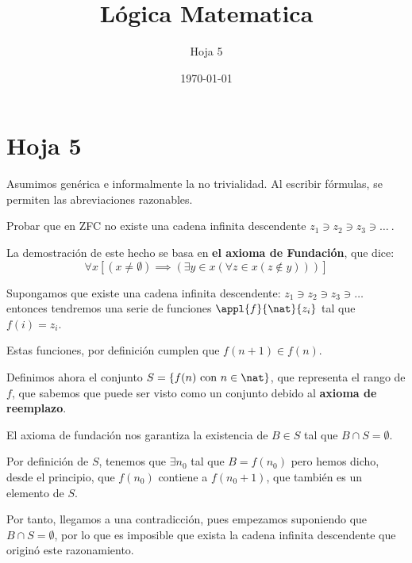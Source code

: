 \documentclass[nochap]{apuntes}
\title{Lógica Matematica}
\author{Hoja 5}
\date{\today}
\begin{document}
\maketitle
\newpage

\section{Hoja 5}

Asumimos gen\'erica e informalmente la no trivialidad. Al escribir f\'ormulas, se permiten
las abreviaciones razonables. 

\begin{problem} 
	Probar que en ZFC no existe una cadena infinita descendente $z_1 \ni z_2 \ni z_3 \ni \dots \ $.
	
	\solution
	
	La demostración de este hecho se basa en \textbf{el axioma de Fundación}, que dice:
	\[\forall x \left[(x\neq \emptyset)\implies (\exists y \in x (\forall z \in x (z\notin y)))\right]\]
	
	Supongamos que existe una cadena infinita descendente: $z_1 \ni z_2 \ni z_3 \ni \dots \ $ entonces tendremos una serie de funciones $\appl{f}{\nat}{z_i}$ tal que $f(i)=z_i$.
	
	Estas funciones, por definición cumplen que $f(n+1) \in f(n)$.
	
	Definimos ahora el conjunto $S=\{f(n) \text{ con } n\in \nat \}$, que representa el rango de $f$, que sabemos que puede ser visto como un conjunto debido al \textbf{axioma de reemplazo}.
	
	El axioma de fundación nos garantiza la existencia de $B \in S$ tal que $B \cap S = \emptyset$. 
	
	Por definición de $S$, tenemos que $\exists n_0$ tal que $B=f(n_0)$ pero hemos dicho, desde el principio, que $f(n_0)$ contiene a $f(n_0+1)$, que también es un elemento de $S$.
	
	Por tanto, llegamos a una contradicción, pues empezamos suponiendo que $B \cap S = \emptyset$, por lo que es imposible que exista la cadena infinita descendente que originó este razonamiento.
	
\end{problem}
\end{document}
